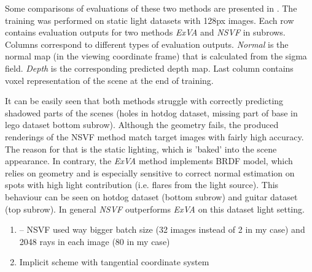 

Some comparisons of evaluations of these two methods are presented in .
The training was performed on static light datasets with 128px images.
Each row contains evaluation outputs for two methods \textit{ExVA} and \textit{NSVF} in subrows.
Columns correspond to different types of evaluation outputs.
\textit{Normal} is the normal map (in the viewing coordinate frame)
that is calculated from the sigma field.
\textit{Depth} is the corresponding predicted depth map.
Last column contains voxel representation of the scene at the end of training.

It can be easily seen that both methods struggle
with correctly predicting shadowed parts of the scenes
(holes in hotdog dataset, missing part of base in lego dataset bottom subrow).
Although the geometry fails, the produced renderings
of the NSVF method match target images with fairly high accuracy.
The reason for that is the static lighting, which is 'baked' into the scene appearance.
In contrary, the \textit{ExVA} method implements BRDF model,
which relies on geometry and is especially sensitive to correct normal estimation
on spots with high light contribution (i.e. flares from the light source).
This behaviour can be seen on hotdog dataset (bottom subrow)
and guitar dataset (top subrow).
In general \textit{NSVF} outperforms \textit{ExVA} on this dataset light setting.



\begin{enumerate}
    \item {}
    -- NSVF used way bigger batch size (32 images instead of 2 in my case) and 2048 rays in each image (80 in my case)
    \item Implicit scheme with tangential coordinate system
\end{enumerate}





